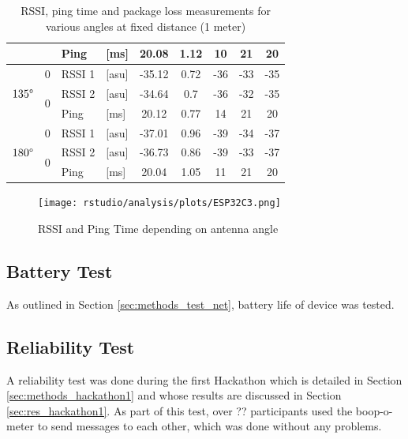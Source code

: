 \begin{table}[H]
\begin{tabular}{|c|c|l|l|c|c|c|c|c|}
        && Ping & [ms] & 20.08 & 1.12 & 10 & 21 & 20 \\\hline\hline
        \multirow{3}{*}{$135\degree$} & \multirow{1}{*}{0} & RSSI 1 & [asu] & -35.12 & 0.72 & -36 & -33 & -35 \\\cline{2-9}\cline{2-9}
        & \multirow{2}{*}{0} & RSSI 2 & [asu] & -34.64 & 0.7 & -36 & -32 & -35 \\\cline{3-9}
        && Ping & [ms] & 20.12 & 0.77 & 14 & 21 & 20 \\\hline\hline
        \multirow{3}{*}{$180\degree$} & \multirow{1}{*}{0} & RSSI 1 & [asu] & -37.01 & 0.96 & -39 & -34 & -37 \\\cline{2-9}\cline{2-9}
        & \multirow{2}{*}{0} & RSSI 2 & [asu] & -36.73 & 0.86 & -39 & -33 & -37 \\\cline{3-9}
        && Ping & [ms] & 20.04 & 1.05 & 11 & 21 & 20 \\\hline
    \end{tabular}
    \vspace{\ftspace}
    \caption{RSSI, ping time and package loss measurements for various angles at fixed distance (1 meter)}
    \label{tab:angle_res}
\end{table}

\begin{figure}[H]
    \centering
    \texttt{[image: rstudio/analysis/plots/ESP32C3.png]}
    \vspace{\ftspace}
    \caption{RSSI and Ping Time depending on antenna angle}
    \label{fig:antennaangle}
\end{figure}

\subsection{\label{sec:res_battery}Battery Test}

As outlined in Section \ref{sec:methods_test_net}, battery life of device was tested.

\subsection{\label{sec:res_reliability}Reliability Test}
A reliability test was done during the first Hackathon which is detailed in Section \ref{sec:methods_hackathon1} and whose results are discussed in Section \ref{sec:res_hackathon1}. As part of this test, over ?? participants used the boop-o-meter to send messages to each other, which was done without any problems.

